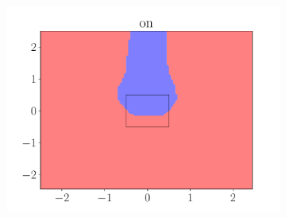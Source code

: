 \documentclass{beamer}
\begin{document}
\begin{frame}
\begin{figure}[ht]
\begin{subfigure}{0.45\textwidth}
            \includegraphics[width=\textwidth]{figures/on_predicate_only}
        \end{subfigure}
    \end{figure}
\end{frame}
\end{document}
